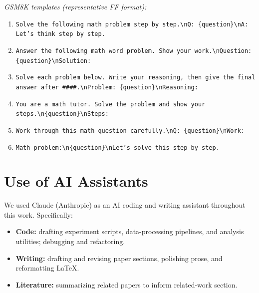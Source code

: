 \smallskip\noindent\textit{GSM8K templates (representative FF format):}
\begin{enumerate}\setlength{\itemsep}{0pt}\setlength{\parsep}{0pt}\setlength{\topsep}{0pt}
\item \texttt{Solve the following math problem step by step.\textbackslash nQ: \{question\}\textbackslash nA: Let's think step by step.}
\item \texttt{Answer the following math word problem. Show your work.\textbackslash nQuestion: \{question\}\textbackslash nSolution:}
\item \texttt{Solve each problem below. Write your reasoning, then give the final answer after \#\#\#\#.\textbackslash nProblem: \{question\}\textbackslash nReasoning:}
\item \texttt{You are a math tutor. Solve the problem and show your steps.\textbackslash n\{question\}\textbackslash nSteps:}
\item \texttt{Work through this math question carefully.\textbackslash nQ: \{question\}\textbackslash nWork:}
\item \texttt{Math problem:\textbackslash n\{question\}\textbackslash nLet's solve this step by step.}
\end{enumerate}

\section{Use of AI Assistants}
\label{app:ai-assistants}

We used Claude (Anthropic) as an AI coding and writing assistant throughout this work. Specifically:
\begin{itemize}
    \item \textbf{Code:} drafting experiment scripts, data-processing pipelines, and analysis utilities; debugging and refactoring.
    \item \textbf{Writing:} drafting and revising paper sections, polishing prose, and reformatting \LaTeX{}.
    \item \textbf{Literature:} summarizing related papers to inform related-work section.
\end{itemize}
